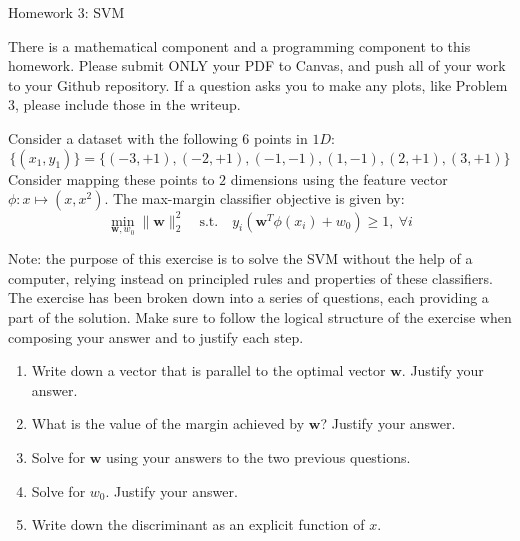\documentclass[submit]{harvardml}
\begin{document}
\begin{center}
{\Large Homework 3: SVM}\\
\end{center}

There is a mathematical component and a programming component to this homework.
Please submit ONLY your PDF to Canvas, and push all of your work to your Github
repository. If a question asks you to make any plots, like Problem 3, please
include those in the writeup.

\begin{problem}
Consider a dataset with the following 6 points in $1D$: \[\{(x_1, y_1)\} =\{(-3
, +1 ), (-2 , +1 ) , (-1,  -1 ), ( 1 , -1 ), ( 2 , +1 ), ( 3 , +1 )\}\] Consider
mapping these points to $2$ dimensions using the feature vector $\phi : x
\mapsto (x, x^2)$. The max-margin classifier objective is given by:
\begin{equation}
  \min_{\mathbf{w}, w_0} \|\mathbf{w}\|_2^2 \quad \text{s.t.} \quad y_i(\mathbf{w}^T \phi(x_i) +
  w_0) \geq 1,~\forall i
\end{equation}

Note: the purpose of this exercise is to solve the SVM without the help of a
computer, relying instead on principled rules and properties of these
classifiers. The exercise has been broken down into a series of questions, each
providing a part of the solution. Make sure to follow the logical structure of
the exercise when composing your answer and to justify each step.

\begin{enumerate}
  \item Write down a vector that is parallel to the optimal vector $\mathbf{w}$. Justify
    your answer.
  \item What is the value of the margin achieved by $\mathbf{w}$? Justify your
    answer.
  \item Solve for $\mathbf{w}$ using your answers to the two previous questions.
  \item Solve for $w_0$. Justify your answer.
  \item Write down the discriminant as an explicit function of $x$.
\end{enumerate}

\end{problem}
\end{document}
